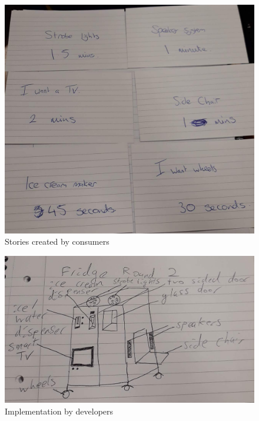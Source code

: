 \documentclass[12pt]{article}
\begin{document}
\begin{figure}[!htb]
    \includegraphics[width=\linewidth]{iteration-2-cards.png}
    \caption{Stories created by consumers}
\end{figure}
\begin{figure}[!htb]
    \includegraphics[width=\linewidth]{iteration-2-fridge.png}
    \caption{Implementation by developers}
\end{figure}
\end{document}
